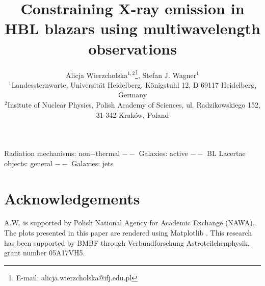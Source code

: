 \documentclass[useAMS,usenatbib]{mnras}
\title[Constraining X-ray emission in  HBL blazars using multiwavelength observations]{Constraining X-ray emission in  HBL blazars using multiwavelength observations }
\author[A. Wierzcholska, S.Wagner]{
    Alicja Wierzcholska$^{1,2}$\thanks{E-mail: alicja.wierzcholska@ifj.edu.pl}, Stefan J. Wagner$^{1}$\\
    $^{1}$Landessternwarte, Universit\"at Heidelberg, K\"onigstuhl 12, D 69117 Heidelberg, Germany \\
    $^{2}$Insitute of Nuclear Physics, Polish Academy of Sciences, ul. Radzikowskiego 152, 31-342 Krak\'{o}w, Poland\\
   }
\begin{document}
\pagerange{\pageref{firstpage}--\pageref{lastpage}} 
\maketitle
\label{firstpage}



\begin{keywords}
Radiation mechanisms: non$-$thermal $--$ Galaxies: active $--$ BL Lacertae objects: general $--$ Galaxies: jets
\end{keywords}












\section*{Acknowledgements}
A.W. is supported by Polish National Agency for Academic Exchange (NAWA). 
The plots presented in this paper are rendered using Matplotlib \citep{matplotlib}.
This research has been supported by BMBF through Verbundforschung
Astroteilchenphysik, grant number 05A17VH5.






\end{document}
